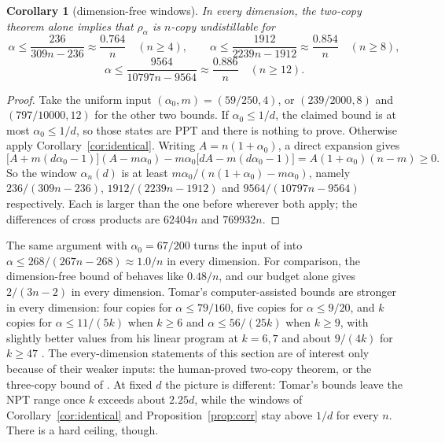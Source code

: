 \documentclass[11pt]{article}
\newtheorem{corollary}[theorem]{Corollary}
\theoremstyle{remark}
\begin{document}
\begin{corollary}[dimension-free windows]
In every dimension, the two-copy theorem alone implies that $\rho_\alpha$ is $n$-copy undistillable for
\[
\alpha\le\frac{236}{309n-236}\approx\frac{0.764}{n}\quad(n\ge4),\qquad
\alpha\le\frac{1912}{2239n-1912}\approx\frac{0.854}{n}\quad(n\ge8),
\]
\[
\alpha\le\frac{9564}{10797n-9564}\approx\frac{0.886}{n}\quad(n\ge12).
\]
\end{corollary}
\begin{proof}
Take the uniform input $(\alpha_0,m)=(59/250,4)$, or $(239/2000,8)$ and $(797/10000,12)$ for the other two bounds.
If $\alpha_0\le1/d$, the
claimed bound is at most $\alpha_0\le1/d$, so those states are PPT and there is nothing to prove. Otherwise apply
Corollary~\ref{cor:identical}. Writing $A=n(1+\alpha_0)$, a direct expansion
gives
\[
\big[A+m(d\alpha_0-1)\big](A-m\alpha_0)-m\alpha_0\big[dA-m(d\alpha_0-1)\big]=A(1+\alpha_0)(n-m)\ge0.
\]
So the window $\alpha_n(d)$ is at least $m\alpha_0/(n(1+\alpha_0)-m\alpha_0)$, namely $236/(309n-236)$,
$1912/(2239n-1912)$ and $9564/(10797n-9564)$ respectively. Each is larger than the one before wherever both apply;
the differences of cross products are $62404n$ and $769932n$.
\end{proof}
The same argument with $\alpha_0=67/200$ turns the input of \cite{MB} into $\alpha\le268/(267n-268)\approx1.0/n$ in every
dimension. For comparison, the dimension-free bound of \cite{QGWG} behaves like $0.48/n$, and our budget alone gives
$2/(3n-2)$ in every dimension. Tomar's computer-assisted bounds are stronger in every dimension: four copies for
$\alpha\le79/160$, five copies for $\alpha\le9/20$, and $k$ copies for $\alpha\le11/(5k)$ when $k\ge6$ and
$\alpha\le56/(25k)$ when $k\ge9$, with slightly better values from his linear program at $k=6,7$ and about $9/(4k)$ for
$k\ge47$ \cite{Tomar}. The every-dimension statements of this section are of interest only because of their weaker
inputs: the human-proved two-copy theorem, or the three-copy bound of \cite{MB}. At fixed $d$ the picture is
different: Tomar's bounds leave the NPT range once $k$ exceeds about $2.25d$, while
the windows of Corollary~\ref{cor:identical} and Proposition~\ref{prop:corr} stay above $1/d$ for every $n$. There is a
hard ceiling, though.
\end{document}
